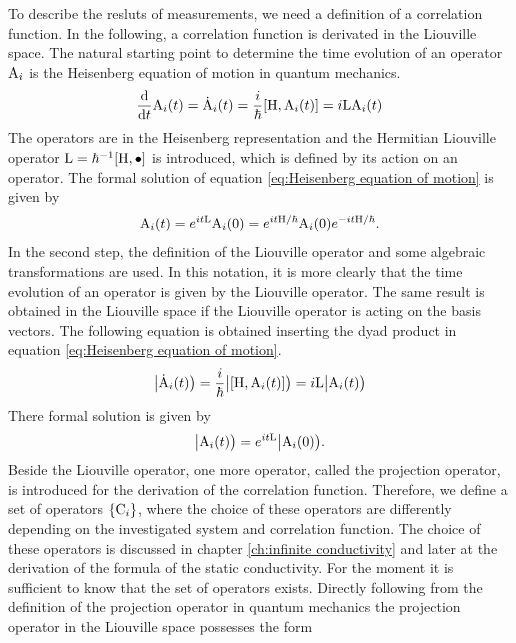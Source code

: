 To describe the resluts of measurements, we need a definition of a correlation function.
In the following, a correlation function is derivated in the Liouville space.
The natural starting point to determine the time evolution of an operator $\mathrm{A}_{i}$ is the Heisenberg equation of motion in quantum mechanics.
%
\begin{align}
	\dv{t} \mt{A}_{i}(t) = \dot{\mt{A}}_{i}(t) = \frac{i}{\hbar} \comm{\mt{H}}{\mt{A}_{i}(t)} = i \mt{L} \mt{A}_{i}(t)
	\label{eq:Heisenberg equation of motion}
\end{align}
%
The operators are in the Heisenberg representation and the Hermitian Liouville operator ${\mt{L} = \hbar^{-1} \comm{\mt{H}}{\mt{\bullet}}}$ is introduced, which is defined by its action on an operator.
The formal solution of equation \eqref{eq:Heisenberg equation of motion} is given by
%
\begin{align}
	\mathrm{A}_{i}(t) = e^{it\mathrm{L}} \mathrm{A}_{i}(0) = e^{it\mathrm{H}/\hbar} \mathrm{A}_{i}(0) e^{-it\mathrm{H}/\hbar}.
\end{align}
%
In the second step, the definition of the Liouville operator and some algebraic transformations are used.
In this notation, it is more clearly that the time evolution of an operator is given by the Liouville operator.
The same result is obtained in the Liouville space if the Liouville operator is acting on the basis vectors.
The following equation is obtained inserting the dyad product in equation \eqref{eq:Heisenberg equation of motion}.
%
\begin{align}
	\oket{\dot{\mt{A}}_{i}(t)} = \frac{i}{\hbar} \oket{\comm{\mt{H}}{\mt{A}_{i}(t)}} = i \mt{L} \oket{\mt{A}_{i}(t)}
	\label{eq:Heisenberg equation of motion in Liouville space}
\end{align}
%
There formal solution is given by
%
\begin{align}
	\big|{\mathrm{A}_{i}(t)}\big) = e^{it\mathrm{L}} \big|{\mathrm{A}_{i}(0)}\big).
	\label{eq:formal solution of EM in L}
\end{align}
%
Beside the Liouville operator, one more operator, called the projection operator, is introduced for the derivation of the correlation function.
Therefore, we define a set of operators $\{\mathrm{C}_{i}\}$, where the choice of these operators are differently depending on the investigated system and correlation function.
The choice of these operators is discussed in chapter \ref{ch:infinite conductivity} and later at the derivation of the formula of the static conductivity.
For the moment it is sufficient to know that the set of operators exists.
Directly following from the definition of the projection operator in quantum mechanics the projection operator in the Liouville space possesses the form
